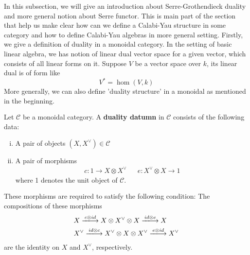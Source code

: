 In this subsection, we will give an introduction about Serre-Grothendieck duality and more general notion about Serre functor. This is main part of the section that help us make clear how can we define a Calabi-Yau structure in some category and how to define Calabi-Yau algebras in more general setting.
Firstly, we give a definition of duality in a monoidal category. In the setting of basic linear algebra, we has notion of linear dual vector space for a given vector, which consists of all linear forms on it. Suppose $V$ be a vector space over $k$, its linear dual is of form like
\[
V^* = \hom(V,k)
\]
More generally, we can also define 'duality structure' in a monoidal as mentioned in the beginning.
\begin{mydefn}
Let $\mathcal{C}$ be a monoidal category. A \textbf{duality datumn} in $\mathcal{C}$ consists of the following data:
\begin{enumerate}[(i)]
	\item A pair of objects $(X, X^{\vee}) \in \mathcal{C}$
	\item A pair of morphisms
	\begin{align*}
	c: 1 \rightarrow X \otimes X^{\vee}& & e: X^{\vee} \otimes X \rightarrow 1
	\end{align*}
	where 1 denotes the unit object of $\mathcal{C}$.
\end{enumerate}
These morphisms are required to satisfy the following condition:
The compositions of these morphisms
\begin{align*}
&X \xlongrightarrow{c \otimes id} X \otimes X^{\vee} \otimes X \xlongrightarrow{id \otimes e} X\\
&X^{\vee} \xlongrightarrow{id \otimes c} X^{\vee} \otimes X \otimes X^{\vee} \xlongrightarrow{e \otimes id} X^{\vee}
\end{align*}
are the identity on $X$ and $X^{\vee}$, respectively.
\end{mydefn}
